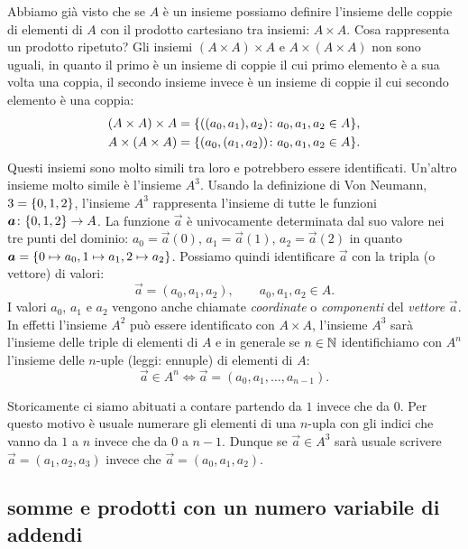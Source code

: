 Abbiamo già visto che se $A$ è un insieme possiamo definire l'insieme 
delle coppie di elementi di $A$ con il prodotto cartesiano tra insiemi: 
$A\times A$. 
Cosa rappresenta un prodotto ripetuto?
Gli insiemi $(A\times A)\times A$ e $A\times(A\times A)$ non sono 
uguali, in quanto il primo è un insieme di coppie il cui primo elemento 
è a sua volta una coppia, il secondo insieme invece è un insieme di coppie 
il cui secondo elemento è una coppia:
\begin{gather*}
  (A\times A)\times A = {\left\{ ((a_0,a_1),a_2)\colon a_0,a_1,a_2\in A \right\}},
  \\
  A \times (A\times A) = {\left\{ (a_0,(a_1,a_2))\colon a_0,a_1,a_2\in A \right\}}.
\end{gather*}
Questi insiemi sono molto simili tra loro e potrebbero essere identificati.
Un'altro insieme molto simile è l'insieme $A^{3}$.  
Usando la definizione di Von Neumann, $3 = {\left\{ 0,1,2 \right\}}$, l'insieme 
$A^{3}$ rappresenta l'insieme di tutte le funzioni 
$\boldsymbol a\colon {\left\{ 0,1,2 \right\}}\to A$.
La funzione $\vec a$ è univocamente determinata dal suo valore nei 
tre punti del dominio: $a_0 = \vec a(0)$, $a_1=\vec a(1)$, $a_2=\vec a(2)$
in quanto $\boldsymbol a = {\left\{ 0\mapsto a_0, 1\mapsto a_1, 2\mapsto a_2 \right\}}$.
Possiamo quindi identificare $\vec a$ con la tripla (o vettore) di valori:
\[
  \vec a = (a_0, a_1, a_2), \qquad a_0,a_1,a_2 \in A.  
\]
I valori $a_0$, $a_1$ e $a_2$ vengono anche chiamate \emph{coordinate}
o \emph{componenti} del \emph{vettore} $\vec a$.
%
%
%
%
%
In effetti l'insieme $A^{2}$ può essere identificato con $A\times A$, l'insieme 
$A^{3}$ sarà l'insieme delle triple di elementi di $A$ e in generale se $n\in{\mathbb N}$ 
identifichiamo con $A^{n}$ l'insieme delle $n$-uple (leggi: ennuple) di elementi 
%
di $A$:%
%
\[
   \vec a \in A^{n} \iff 
   \vec a = (a_0, a_1, \dots, a_{n-1}).  
\]

Storicamente ci siamo abituati a contare partendo da $1$ invece che da $0$.
Per questo motivo è usuale numerare gli elementi di una $n$-upla con gli indici 
che vanno da $1$ a $n$ invece che da $0$ a $n-1$.
Dunque se $\vec a \in A^{3}$ sarà usuale scrivere 
$\vec a = (a_1, a_2, a_3)$ invece che $\vec a = (a_0, a_1, a_2)$.

\subsection{somme e prodotti con un numero variabile di addendi}
%
%

